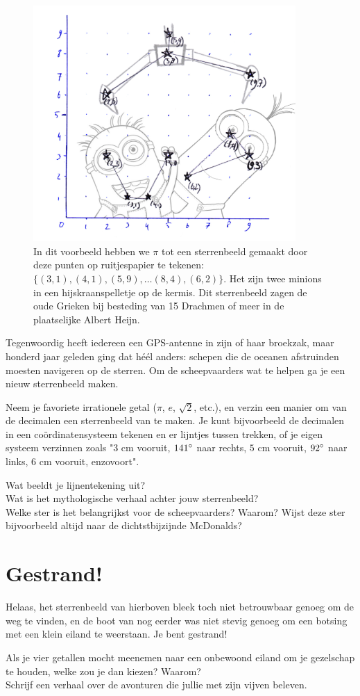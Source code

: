 \documentclass{weekprobleem}
\begin{document}
\begin{figure}
	\centering
	\includegraphics[width=10cm]{pi}
	\caption{\small{In dit voorbeeld hebben we $\pi$ tot een sterrenbeeld gemaakt door deze punten op ruitjespapier te tekenen: $\{(3,1), (4,1), (5,9), \ldots (8,4), (6,2)\}$. Het zijn twee minions in een hijskraanspelletje op de kermis. Dit sterrenbeeld zagen de oude Grieken bij besteding van 15 Drachmen of meer in de plaatselijke Albert Heijn.}}
\end{figure}
Tegenwoordig heeft iedereen een GPS-antenne in zijn of haar broekzak, maar honderd jaar geleden ging dat héél anders: schepen die de oceanen afstruinden moesten navigeren op de sterren.
Om de scheepvaarders wat te helpen ga je een nieuw sterrenbeeld maken.

Neem je favoriete irrationele getal ($\pi$, $e$, $\sqrt{2}$, etc.), en verzin een manier om van de decimalen een sterrenbeeld van te maken.
Je kunt bijvoorbeeld de decimalen in een coördinatensysteem tekenen en er lijntjes tussen trekken, of je eigen systeem verzinnen zoals "$3$ cm vooruit, $141{\degree}$ naar rechts, $5$ cm vooruit, $92{\degree}$ naar links, $6$ cm vooruit, enzovoort".

Wat beeldt je lijnentekening uit?\\
Wat is het mythologische verhaal achter jouw sterrenbeeld?\\
Welke ster is het belangrijkst voor de scheepvaarders? Waarom? Wijst deze ster bijvoorbeeld altijd naar de dichtstbijzijnde McDonalds?


\section*{Gestrand!}

Helaas, het sterrenbeeld van hierboven bleek toch niet betrouwbaar genoeg om de weg te vinden, en de boot van nog eerder was niet stevig genoeg om een botsing met een klein eiland te weerstaan. Je bent gestrand!

Als je vier getallen mocht meenemen naar een onbewoond eiland om je gezelschap te houden, welke zou je dan kiezen? Waarom?\\
Schrijf een verhaal over de avonturen die jullie met zijn vijven beleven.
\end{document}
